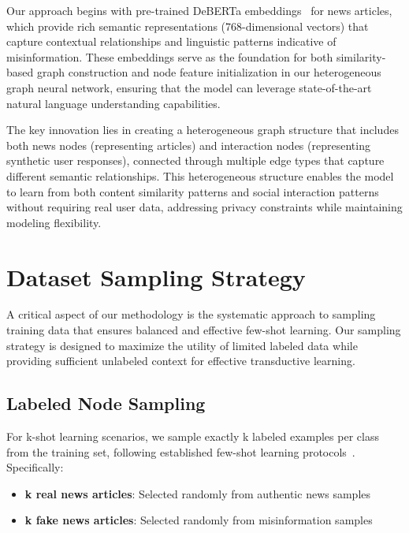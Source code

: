 
Our approach begins with pre-trained DeBERTa embeddings~\cite{he2021deberta} for news articles, which provide rich semantic representations (768-dimensional vectors) that capture contextual relationships and linguistic patterns indicative of misinformation. These embeddings serve as the foundation for both similarity-based graph construction and node feature initialization in our heterogeneous graph neural network, ensuring that the model can leverage state-of-the-art natural language understanding capabilities.

The key innovation lies in creating a heterogeneous graph structure that includes both news nodes (representing articles) and interaction nodes (representing synthetic user responses), connected through multiple edge types that capture different semantic relationships. This heterogeneous structure enables the model to learn from both content similarity patterns and social interaction patterns without requiring real user data, addressing privacy constraints while maintaining modeling flexibility.

\section{Dataset Sampling Strategy}

A critical aspect of our methodology is the systematic approach to sampling training data that ensures balanced and effective few-shot learning. Our sampling strategy is designed to maximize the utility of limited labeled data while providing sufficient unlabeled context for effective transductive learning.

\subsection{Labeled Node Sampling}

For k-shot learning scenarios, we sample exactly k labeled examples per class from the training set, following established few-shot learning protocols~\cite{wang2020fewshot, finn2017model}. Specifically:
\begin{itemize}
    \item \textbf{k real news articles}: Selected randomly from authentic news samples
    \item \textbf{k fake news articles}: Selected randomly from misinformation samples  
\end{itemize}

